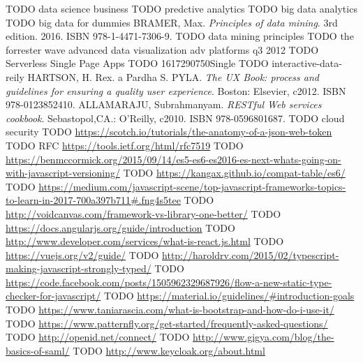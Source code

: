 \begin{thebibliography}{99}
TODO data science business
TODO predctive analytics
TODO big data analytics
TODO big data for dummies
BRAMER, Max.
\textit{Principles of data mining}.
3rd edition. 2016. ISBN 978-1-4471-7306-9.
TODO data mining principles
TODO the forrester wave advanced data visualization adv platforms q3 2012
TODO Serverless Single Page Apps
TODO 1617290750Single
TODO interactive-data-reily
HARTSON, H. Rex. a Pardha S. PYLA.
\textit{The UX Book: process and guidelines for ensuring a quality user experience}.
Boston: Elsevier, c2012. ISBN 978-0123852410.
ALLAMARAJU, Subrahmanyam.
\textit{RESTful Web services cookbook}.
Sebastopol,CA.: O'Reilly, c2010. ISBN 978-0596801687.
TODO cloud security
TODO \url{https://scotch.io/tutorials/the-anatomy-of-a-json-web-token}
TODO RFC \url{https://tools.ietf.org/html/rfc7519}
TODO \url{https://benmccormick.org/2015/09/14/es5-es6-es2016-es-next-whats-going-on-with-javascript-versioning/}
TODO \url{https://kangax.github.io/compat-table/es6/}
TODO \url{https://medium.com/javascript-scene/top-javascript-frameworks-topics-to-learn-in-2017-700a397b711#.fng4s5tee}
TODO \url{http://voidcanvas.com/framework-vs-library-one-better/}
TODO \url{https://docs.angularjs.org/guide/introduction}
TODO \url{http://www.developer.com/services/what-is-react.js.html}
TODO \url{https://vuejs.org/v2/guide/}
TODO \url{http://haroldrv.com/2015/02/typescript-making-javascript-strongly-typed/}
TODO \url{https://code.facebook.com/posts/1505962329687926/flow-a-new-static-type-checker-for-javascript/}
TODO \url{https://material.io/guidelines/#introduction-goals}
TODO \url{https://www.taniarascia.com/what-is-bootstrap-and-how-do-i-use-it/}
TODO \url{https://www.patternfly.org/get-started/frequently-asked-questions/}
TODO \url{http://openid.net/connect/}
TODO \url{http://www.gigya.com/blog/the-basics-of-saml/}
TODO \url{http://www.keycloak.org/about.html}

\end{thebibliography}
